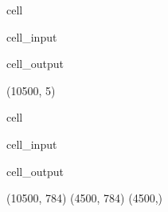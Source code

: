 \documentclass[letterpaper,10pt,english]{jupyterBook}
\begin{document}
\begin{sphinxuseclass}{cell}\begin{sphinxVerbatimInput}

\begin{sphinxuseclass}{cell_input}
\begin{sphinxVerbatim}[commandchars=\\\{\}]
\end{sphinxVerbatim}

\end{sphinxuseclass}\end{sphinxVerbatimInput}
\begin{sphinxVerbatimOutput}

\begin{sphinxuseclass}{cell_output}
\begin{sphinxVerbatim}[commandchars=\\\{\}]
(10500, 5)
\end{sphinxVerbatim}

\end{sphinxuseclass}\end{sphinxVerbatimOutput}

\end{sphinxuseclass}
\begin{sphinxuseclass}{cell}\begin{sphinxVerbatimInput}

\begin{sphinxuseclass}{cell_input}
\begin{sphinxVerbatim}[commandchars=\\\{\}]
\end{sphinxVerbatim}

\end{sphinxuseclass}\end{sphinxVerbatimInput}
\begin{sphinxVerbatimOutput}

\begin{sphinxuseclass}{cell_output}
\begin{sphinxVerbatim}[commandchars=\\\{\}]
(10500, 784)
(4500, 784)
(4500,)
\end{sphinxVerbatim}

\end{sphinxuseclass}\end{sphinxVerbatimOutput}

\end{sphinxuseclass}
\end{document}
